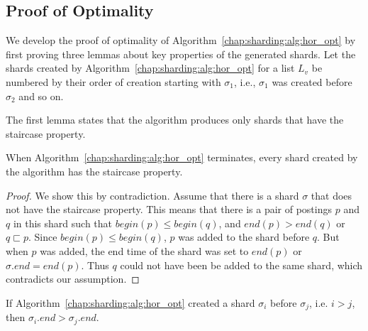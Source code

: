 \subsection{Proof of Optimality}
We develop the proof of optimality of Algorithm~\ref{chap:sharding:alg:hor_opt}
by first proving three lemmas about key properties of the
generated shards. Let the shards created by
Algorithm~\ref{chap:sharding:alg:hor_opt} for a list $L_{v}$ be numbered by their
order of creation starting with $\sigma_1$, i.e., $\sigma_1$ was created before $\sigma_2$ and so on.

The first lemma states that the algorithm produces only shards that
have the staircase property.

\begin{lemma}
\label{lem:staircase_property}
		When Algorithm~\ref{chap:sharding:alg:hor_opt} terminates, every shard created by the algorithm has the staircase property.
\end{lemma}
\begin{proof}{}
We show this by contradiction. Assume that there is a shard $\sigma$ that does
 not have the staircase property. This means that there is a pair of postings 
 $p$ and $q$ in this shard such that $begin(p)\leq begin(q)$, and $end(p
 ) > end(q)$ or $q \sqsubset p$. Since $begin(p) \leq begin(q)$, $p$ was added to the shard 
 before $q$. But when $p$ was added, the end time of the shard was set to $
 end(p)$ or $\sigma.end = end(p)$. Thus $q$ could not have been be added to the same shard, which contradicts our assumption.
\end{proof}

\begin{lemma}
\label{lem:descending_endtimes}
If Algorithm~\ref{chap:sharding:alg:hor_opt} created a shard $\sigma_i$ before $\sigma_{j}$, i.e. $i > j$, then $\sigma_i.end > \sigma_{j}.end$.
\end{lemma}

